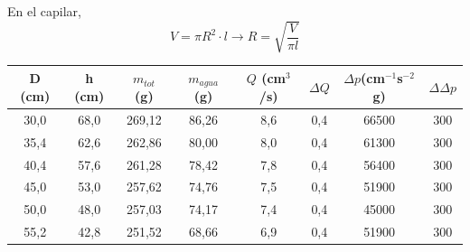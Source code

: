 \documentclass[a4paper,12pt,spanish]{article}
\begin{document}
	
	

	
	En el capilar, 
	\[V = \pi R^2 \cdot l \longrightarrow R = \sqrt{\frac{V}{\pi l}}\]
	
	
	
	
	
	
	\begin{table}[H]
		\centering
		\begin{tabular}{cccccccc}
			\hline
			\multicolumn{1}{|c|}{D (cm)} & \multicolumn{1}{c|}{h (cm)} & \multicolumn{1}{c|}{$m_{tot}$ (g)} & \multicolumn{1}{c|}{$m_{agua}$  (g)} & \multicolumn{1}{c|}{$Q$ (cm$^3$/s)} & \multicolumn{1}{c|}{$\Delta Q$} & \multicolumn{1}{c|}{$\mathit{\Delta} p$(cm$^{-1}$s$^{-2}$g)} & \multicolumn{1}{c|}{$\Delta \mathit{\Delta}p$} \\ \hline\hline
			\multicolumn{1}{|c|}{30,0} & \multicolumn{1}{c|}{68,0} & \multicolumn{1}{c|}{269,12} & \multicolumn{1}{c|}{86,26} & \multicolumn{1}{c|}{8,6} & \multicolumn{1}{c|}{0,4} & \multicolumn{1}{c|}{66500} & \multicolumn{1}{c|}{300} \\ \hline
			\multicolumn{1}{|c|}{35,4} & \multicolumn{1}{c|}{62,6} & \multicolumn{1}{c|}{262,86} & \multicolumn{1}{c|}{80,00} & \multicolumn{1}{c|}{8,0} & \multicolumn{1}{c|}{0,4} & \multicolumn{1}{c|}{61300} & \multicolumn{1}{c|}{300} \\ \hline
			\multicolumn{1}{|c|}{40,4} & \multicolumn{1}{c|}{57,6} & \multicolumn{1}{c|}{261,28} & \multicolumn{1}{c|}{78,42} & \multicolumn{1}{c|}{7,8} & \multicolumn{1}{c|}{0,4} & \multicolumn{1}{c|}{56400} & \multicolumn{1}{c|}{300} \\ \hline
			\multicolumn{1}{|c|}{45,0} & \multicolumn{1}{c|}{53,0} & \multicolumn{1}{c|}{257,62} & \multicolumn{1}{c|}{74,76} & \multicolumn{1}{c|}{7,5} & \multicolumn{1}{c|}{0,4} & \multicolumn{1}{c|}{51900} & \multicolumn{1}{c|}{300} \\ \hline
			\multicolumn{1}{|c|}{50,0} & \multicolumn{1}{c|}{48,0} & \multicolumn{1}{c|}{257,03} & \multicolumn{1}{c|}{74,17} & \multicolumn{1}{c|}{7,4} & \multicolumn{1}{c|}{0,4} & \multicolumn{1}{c|}{45000} & \multicolumn{1}{c|}{300} \\ \hline
			\multicolumn{1}{|c|}{55,2} & \multicolumn{1}{c|}{42,8} & \multicolumn{1}{c|}{251,52} & \multicolumn{1}{c|}{68,66} & \multicolumn{1}{c|}{6,9} & \multicolumn{1}{c|}{0,4} & \multicolumn{1}{c|}{51900} & \multicolumn{1}{c|}{300} \\ \hline

\end{tabular}
\end{table}
\end{document}
